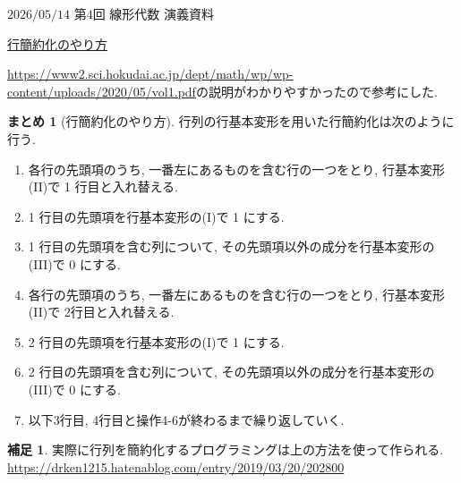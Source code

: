 \documentclass[dvipdfmx,a4paper,11pt]{article} %
\theoremstyle{definition}
\newtheorem{rem}[thm]{補足}
\newtheorem{suma}[thm]{まとめ}
\begin{document}
$\boxed{\text{2026/05/14 第4回 線形代数 演義資料}}$

\underline{行簡約化のやり方}
 
 
\url{https://www2.sci.hokudai.ac.jp/dept/math/wp/wp-content/uploads/2020/05/vol1.pdf}の説明がわかりやすかったので参考にした. 

\begin{tcolorbox}[
    colback = white,
    colframe = green!35!black,
    fonttitle = \bfseries,
    breakable = true]
        \begin{suma}[行簡約化のやり方]
\label{suma-gyokanyaku}
行列の行基本変形を用いた行簡約化は次のように行う.
\begin{enumerate}[label=\textbf{操作}\arabic*.]
    \setlength{\parskip}{0cm} 
  \setlength{\itemsep}{0cm}
 \item 各行の先頭項のうち, 一番左にあるものを含む行の一つをとり, 行基本変形(II)で 1 行目と入れ替える. 
\item 1 行目の先頭項を行基本変形の(I)で 1 にする.
\item 1 行目の先頭項を含む列について, その先頭項以外の成分を行基本変形の(III)で 0 にする.
\item 各行の先頭項のうち, 一番左にあるものを含む行の一つをとり, 行基本変形(II)で 2行目と入れ替える. 
\item 2 行目の先頭項を行基本変形の(I)で 1 にする.
\item 2 行目の先頭項を含む列について, その先頭項以外の成分を行基本変形の(III)で 0 にする.
\item 以下3行目, 4行目と操作4-6が終わるまで繰り返していく. 
 \end{enumerate}
\end{suma}
 \end{tcolorbox}



\begin{rem}
実際に行列を簡約化するプログラミングは上の方法を使って作られる.  \url{https://drken1215.hatenablog.com/entry/2019/03/20/202800}
\end{rem}
 
\end{document}
